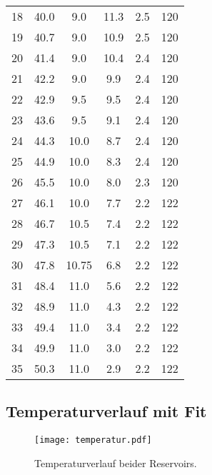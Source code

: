 \begin{table}
\begin{tabular}{S[table-format = 2.0] S[table-format = 2.1] S[table-format = 2.2] S[table-format = 2.1]
     S[table-format = 1.1] S[table-format = 3.0]}
    18	& 40.0 &	9.0    &	11.3 & 2.5 & 120 \\
    19	& 40.7 &	9.0    &	10.9 & 2.5 & 120 \\
    20	& 41.4 &	9.0    &	10.4 & 2.4 & 120 \\
    21	& 42.2 &	9.0    &	9.9	 & 2.4 & 120 \\
    22	& 42.9 &	9.5    &	9.5	 & 2.4 & 120 \\
    23	& 43.6 &	9.5    &	9.1	 & 2.4 & 120 \\
    24	& 44.3 &	10.0   &  8.7  & 2.4 & 120 \\
    25	& 44.9 &	10.0   &  8.3  & 2.4 & 120 \\
    26	& 45.5 &	10.0   &  8.0  & 2.3 & 120 \\
    27	& 46.1 &	10.0   &  7.7  & 2.2 & 122 \\
    28	& 46.7 &	10.5   &  7.4  & 2.2 & 122 \\
    29	& 47.3 &	10.5   &  7.1  & 2.2 & 122 \\
    30	& 47.8 &	10.75  &  6.8  & 2.2 & 122 \\
    31	& 48.4 &	11.0   &  5.6  & 2.2 & 122 \\
    32	& 48.9 &	11.0   &  4.3  & 2.2 & 122 \\
    33	& 49.4 &	11.0   &  3.4  & 2.2 & 122 \\
    34	& 49.9 &	11.0   &  3.0  & 2.2 & 122 \\
    35	& 50.3 &	11.0   &  2.9  & 2.2 & 122 \\
    \bottomrule 
  \end{tabular}
\end{table}
\newpage
\subsection{Temperaturverlauf mit Fit}
\begin{figure}
  \centering
  \texttt{[image: temperatur.pdf]}
  \caption{Temperaturverlauf beider Reservoirs.}
  \label{fig:temperatur}
\end{figure}
